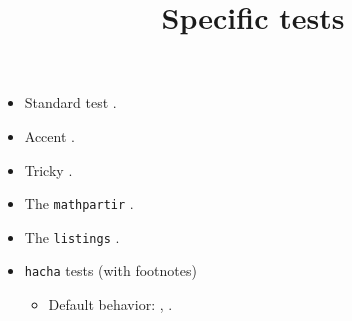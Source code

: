 \documentclass{article}
\title{Specific tests}
\author{}
\date{}
\begin{document}
\maketitle
\begin{itemize}
\item Standard test .
\item Accent .
\item Tricky .
\item The \texttt{mathpartir} .
\item The \texttt{listings} .
\item \texttt{hacha} tests (with footnotes)
\begin{itemize}
\item Default behavior: ,
.
\end{itemize}
\end{itemize}
\end{document}
